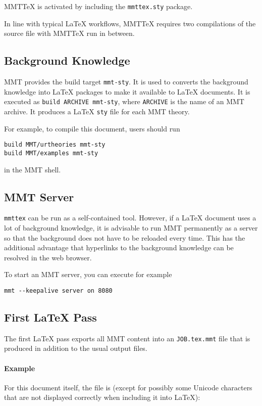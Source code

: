 \documentclass{article}
\begin{document}
MMTTeX is activated by including the \lstinline|mmttex.sty| package.

In line with typical LaTeX workflows, MMTTeX requires two compilations of the source file with MMTTeX run in between.

\subsection{Background Knowledge}

MMT provides the build target \lstinline|mmt-sty|.
It is used to converts the background knowledge into LaTeX packages to make it available to LaTeX documents.
It is executed as
\lstinline|build ARCHIVE mmt-sty|, where \lstinline|ARCHIVE| is the name of an MMT archive.
It produces a LaTeX \lstinline|sty| file for each MMT theory.

For example, to compile this document, users should run
\begin{lstlisting}
build MMT/urtheories mmt-sty
build MMT/examples mmt-sty
\end{lstlisting}
in the MMT shell.

\subsection{MMT Server}

\lstinline|mmttex| can be run as a self-contained tool.
However, if a LaTeX document uses a lot of background knowledge, it is advisable to run MMT permanently as a server so that the background does not have to be reloaded every time.
This has the additional advantage that hyperlinks to the background knowledge can be resolved in the web browser.

To start an MMT server, you can execute for example
\begin{lstlisting}
mmt --keepalive server on 8080
\end{lstlisting}


\subsection{First LaTeX Pass}

The first LaTeX pass exports all MMT content into an \lstinline|JOB.tex.mmt| file that is produced in addition to the usual output files.

\paragraph{Example}
For this document itself, the file is (except for possibly some Unicode characters that are not displayed correctly when including it into LaTeX):
\end{document}
